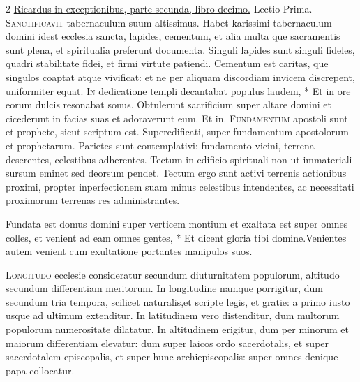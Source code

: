 \begin{multicols*}{2}
\newline \ul{Ricardus in exceptionibus, parte secunda, libro decimo.} {\color{Red} Lectio Prima.}
\lettrine[lines=2]{\zallmancaps \color{Red} S}{anctificavit} tabernaculum suum altissimus. Habet karissimi tabernaculum domini idest ecclesia sancta, lapides, cementum, et alia multa que sacramentis sunt plena, et spiritualia preferunt documenta. Singuli lapides sunt singuli fideles, quadri stabilitate fidei, et firmi virtute patiendi. Cementum est caritas, que singulos coaptat atque vivificat: et ne per aliquam discordiam invicem discrepent, uniformiter equat. \R
\lettrine[lines=2]{\zallmancaps \color{Blue} I}{n} \hypertarget{in-dedicatione-templi}{\label{in-dedicatione-templi}} dedicatione templi decantabat populus laudem, * Et in ore eorum dulcis resonabat sonus. \V Obtulerunt sacrificium super altare domini et cicederunt in facias suas et adoraverunt eum. Et in.
\lettrine[lines=2]{\zallmancaps \color{Red} F}{undamentum} apostoli sunt et prophete, sicut scriptum est. Superedificati, super fundamentum apostolorum et prophetarum. Parietes sunt contemplativi: fundamento vicini, terrena deserentes, celestibus adherentes. Tectum in edificio spirituali non ut immateriali sursum eminet sed deorsum pendet. Tectum ergo sunt activi terrenis actionibus proximi, propter inperfectionem suam minus celestibus intendentes, ac necessitati proximorum terrenas res administrantes.
\begin{responsory}
{Fundata est domus domini super verticem montium et exaltata est super omnes colles, et venient ad eam omnes gentes, * Et dicent gloria tibi domine.}{Venientes autem venient cum exultatione portantes manipulos suos.}
\end{responsory}%
\lettrine[lines=2]{\zallmancaps \color{Blue} L}{ongitudo} ecclesie consideratur secundum diuturnitatem populorum, altitudo secundum differentiam meritorum. In longitudine namque porrigitur, dum secundum tria tempora, scilicet naturalis,et scripte legis, et gratie: a primo iusto usque ad ultimum extenditur. In latitudinem vero distenditur, dum multorum populorum numerositate dilatatur. In altitudinem erigitur, dum per minorum et maiorum differentiam elevatur: dum super laicos ordo sacerdotalis, et super sacerdotalem episcopalis, et super hunc archiepiscopalis: super omnes denique papa collocatur.

\end{multicols*}
